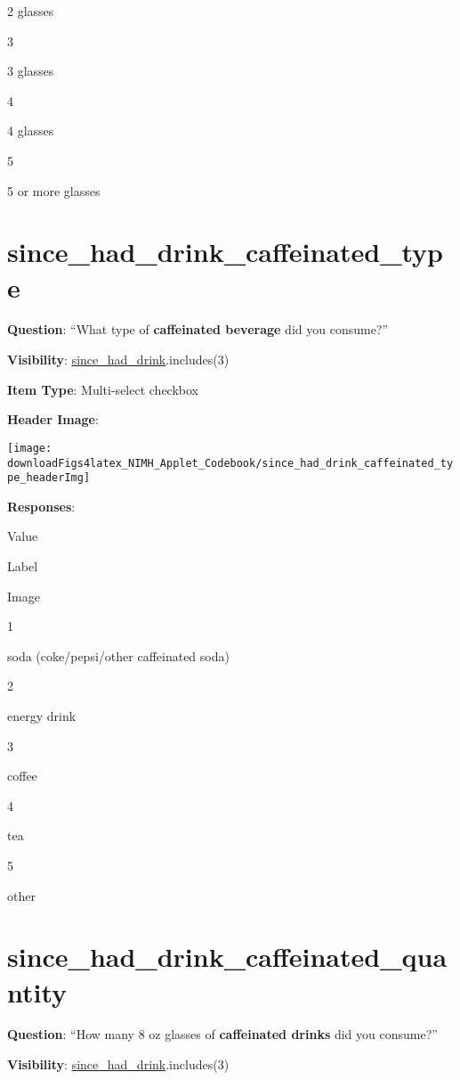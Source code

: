 \documentclass[]{book}
\begin{document}
2 glasses

3

3 glasses

4

4 glasses

5

5 or more glasses

\hypertarget{since_had_drink_caffeinated_type}{%
\section{since\_had\_drink\_caffeinated\_type}\label{since_had_drink_caffeinated_type}}

\textbf{Question}: ``What type of \textbf{caffeinated beverage} did you consume?''

\textbf{Visibility}: \protect\hyperlink{since_had_drink}{since\_had\_drink}.includes(3)

\textbf{Item Type}: Multi-select checkbox

\textbf{Header Image}:

\begin{flushleft}\texttt{[image: downloadFigs4latex\_NIMH\_Applet\_Codebook/since\_had\_drink\_caffeinated\_type\_headerImg]} \end{flushleft}

\textbf{Responses}:

Value

Label

Image

1

soda (coke/pepsi/other caffeinated soda)

2

energy drink

3

coffee

4

tea

5

other

\hypertarget{since_had_drink_caffeinated_quantity}{%
\section{since\_had\_drink\_caffeinated\_quantity}\label{since_had_drink_caffeinated_quantity}}

\textbf{Question}: ``How many 8 oz glasses of \textbf{caffeinated drinks} did you consume?''

\textbf{Visibility}: \protect\hyperlink{since_had_drink}{since\_had\_drink}.includes(3)
\end{document}
